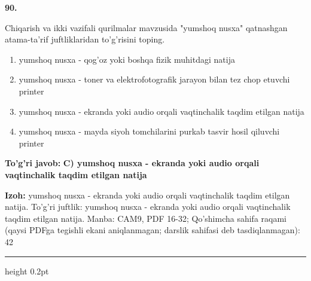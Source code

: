 \documentclass[10pt,a4paper]{article}
\begin{document}
{\bfseries\sffamily\color{ink} 90.}
\par
Chiqarish va ikki vazifali qurilmalar mavzusida "yumshoq nusxa" qatnashgan atama-ta'rif juftliklaridan to'g'risini toping.
\begin{enumerate}[label=\Alph*),leftmargin=9mm]
\item yumshoq nusxa - qog'oz yoki boshqa fizik muhitdagi natija
\item yumshoq nusxa - toner va elektrofotografik jarayon bilan tez chop etuvchi printer
\item yumshoq nusxa - ekranda yoki audio orqali vaqtinchalik taqdim etilgan natija
\item yumshoq nusxa - mayda siyoh tomchilarini purkab tasvir hosil qiluvchi printer
\end{enumerate}
\begin{tcolorbox}[enhanced,breakable,colback=teal!4,colframe=teal!60!black,boxrule=0.45pt,arc=1.2mm,left=2.7mm,right=2.7mm,top=1.8mm,bottom=1.8mm,before skip=2mm,after skip=2mm]
{\bfseries\sffamily\color{teal}To'g'ri javob:} \textbf{C) yumshoq nusxa - ekranda yoki audio orqali vaqtinchalik taqdim etilgan natija}
\par\smallskip
{\bfseries Izoh:} yumshoq nusxa - ekranda yoki audio orqali vaqtinchalik taqdim etilgan natija. To'g'ri juftlik: yumshoq nusxa - ekranda yoki audio orqali vaqtinchalik taqdim etilgan natija. Manba: CAM9, PDF 16-32; Qo'shimcha sahifa raqami (qaysi PDFga tegishli ekani aniqlanmagan; darslik sahifasi deb tasdiqlanmagan): 42
\end{tcolorbox}
\vspace{2mm}\hrule height 0.2pt\vspace{3mm}
\end{document}
